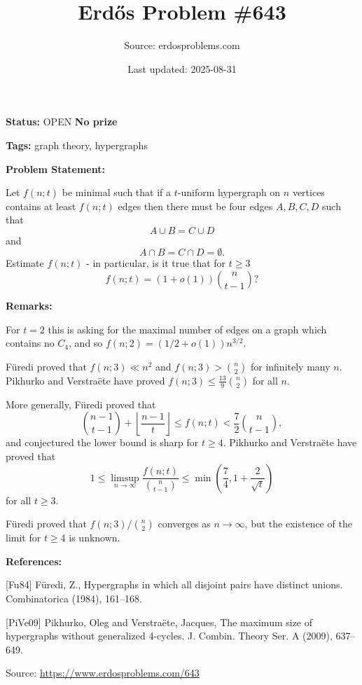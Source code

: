 \documentclass{article}
\title{Erd\H{o}s Problem \#643}
\date{Last updated: 2025-08-31}
\author{Source: erdosproblems.com}
\begin{document}
\maketitle

\noindent\textbf{Status:} OPEN \quad \textbf{No prize}

\noindent\textbf{Tags:} graph theory, hypergraphs

\medskip
\noindent\textbf{Problem Statement:}

Let $f(n;t)$ be minimal such that if a $t$-uniform hypergraph on $n$ vertices contains at least $f(n;t)$ edges then there must be four edges $A,B,C,D$ such that\[A\cup B= C\cup D\]and\[A\cap B=C\cap D=\emptyset.\]Estimate $f(n;t)$ - in particular, is it true that for $t\geq 3$\[f(n;t)=(1+o(1))\binom{n}{t-1}?\]

\bigskip
\noindent\textbf{Remarks:}

For $t=2$ this is asking for the maximal number of edges on a graph which contains no $C_4$, and so $f(n;2)=(1/2+o(1))n^{3/2}$. 

F\"{u}redi \cite{Fu84} proved that $f(n;3) \ll n^2$ and $f(n;3) > \binom{n}{2}$ for infinitely many $n$. Pikhurko and Verstra\"{e}te \cite{PiVe09} have proved $f(n;3)\leq \frac{13}{9}\binom{n}{2}$ for all $n$.

More generally, F\"{u}redi \cite{Fu84} proved that\[\binom{n-1}{t-1}+\left\lfloor\frac{n-1}{t}\right\rfloor\leq f(n;t) < \frac{7}{2}\binom{n}{t-1},\]and conjectured the lower bound is sharp for $t\geq 4$. Pikhurko and Verstra\"{e}te \cite{PiVe09} have proved that\[1 \leq \limsup_{n\to \infty} \frac{f(n;t)}{\binom{n}{t-1}}\leq \min\left(\frac{7}{4},1+\frac{2}{\sqrt{t}}\right)\]for all $t\geq 3$.

F\"{u}redi \cite{Fu84} proved that $f(n;3)/\binom{n}{2}$ converges as $n\to \infty$, but the existence of the limit for $t\geq 4$ is unknown.

\bigskip
\noindent\textbf{References:}

[Fu84] F\"uredi, Z., Hypergraphs in which all disjoint pairs have distinct unions. Combinatorica (1984), 161--168.
 
 [PiVe09] Pikhurko, Oleg and Verstra\"{e}te, Jacques, The maximum size of hypergraphs without generalized 4-cycles. J. Combin. Theory Ser. A (2009), 637--649.

\bigskip
\noindent\small{Source: \url{https://www.erdosproblems.com/643}}
\end{document}
